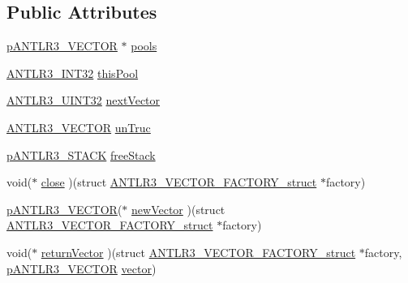 \subsection*{Public Attributes}
\begin{DoxyCompactItemize}
\item 
\hyperlink{antlr3interfaces_8h_a0dfeeada7529fbe1b968be84079b828f}{p\-A\-N\-T\-L\-R3\-\_\-\-V\-E\-C\-T\-O\-R} $\ast$ \hyperlink{struct_a_n_t_l_r3___v_e_c_t_o_r___f_a_c_t_o_r_y__struct_a5511d423918dd58129f1ed61e613810f}{pools}
\item 
\hyperlink{antlr3defs_8h_a6faef5c4687f8eb633d2aefea93973ca}{A\-N\-T\-L\-R3\-\_\-\-I\-N\-T32} \hyperlink{struct_a_n_t_l_r3___v_e_c_t_o_r___f_a_c_t_o_r_y__struct_a853f11c3f176318a279cca18bbc66e7d}{this\-Pool}
\item 
\hyperlink{antlr3defs_8h_ac41f744abd0fd25144b9eb9d11b1dfd1}{A\-N\-T\-L\-R3\-\_\-\-U\-I\-N\-T32} \hyperlink{struct_a_n_t_l_r3___v_e_c_t_o_r___f_a_c_t_o_r_y__struct_ab02f4d8c74c123a9d4f100285f395dfb}{next\-Vector}
\item 
\hyperlink{antlr3collections_8h_abd75b9dda9da7d4b9dbc3fd8f87367f6}{A\-N\-T\-L\-R3\-\_\-\-V\-E\-C\-T\-O\-R} \hyperlink{struct_a_n_t_l_r3___v_e_c_t_o_r___f_a_c_t_o_r_y__struct_a1e5583a477394c1747c3510bd07fa3b6}{un\-Truc}
\item 
\hyperlink{antlr3interfaces_8h_acc1ac4dd91a4d941b628467ac08c0cea}{p\-A\-N\-T\-L\-R3\-\_\-\-S\-T\-A\-C\-K} \hyperlink{struct_a_n_t_l_r3___v_e_c_t_o_r___f_a_c_t_o_r_y__struct_acd0f61708f1e39b2e88fe63dfc73abd1}{free\-Stack}
\item 
void($\ast$ \hyperlink{struct_a_n_t_l_r3___v_e_c_t_o_r___f_a_c_t_o_r_y__struct_a83818d3064adb58578fe4ad0567fd753}{close} )(struct \hyperlink{struct_a_n_t_l_r3___v_e_c_t_o_r___f_a_c_t_o_r_y__struct}{A\-N\-T\-L\-R3\-\_\-\-V\-E\-C\-T\-O\-R\-\_\-\-F\-A\-C\-T\-O\-R\-Y\-\_\-struct} $\ast$factory)
\item 
\hyperlink{antlr3interfaces_8h_a0dfeeada7529fbe1b968be84079b828f}{p\-A\-N\-T\-L\-R3\-\_\-\-V\-E\-C\-T\-O\-R}($\ast$ \hyperlink{struct_a_n_t_l_r3___v_e_c_t_o_r___f_a_c_t_o_r_y__struct_a6b8a6731dfee30248de74188f6d6acb1}{new\-Vector} )(struct \hyperlink{struct_a_n_t_l_r3___v_e_c_t_o_r___f_a_c_t_o_r_y__struct}{A\-N\-T\-L\-R3\-\_\-\-V\-E\-C\-T\-O\-R\-\_\-\-F\-A\-C\-T\-O\-R\-Y\-\_\-struct} $\ast$factory)
\item 
void($\ast$ \hyperlink{struct_a_n_t_l_r3___v_e_c_t_o_r___f_a_c_t_o_r_y__struct_a682d89800cb9cc07d495788265ad02b5}{return\-Vector} )(struct \hyperlink{struct_a_n_t_l_r3___v_e_c_t_o_r___f_a_c_t_o_r_y__struct}{A\-N\-T\-L\-R3\-\_\-\-V\-E\-C\-T\-O\-R\-\_\-\-F\-A\-C\-T\-O\-R\-Y\-\_\-struct} $\ast$factory, \hyperlink{antlr3interfaces_8h_a0dfeeada7529fbe1b968be84079b828f}{p\-A\-N\-T\-L\-R3\-\_\-\-V\-E\-C\-T\-O\-R} \hyperlink{qmb_8m_af54b69a32590de218622e869b06b47b3}{vector})
\end{DoxyCompactItemize}


